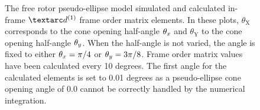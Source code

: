 \begin{figure}
\begin{tabular}{@{}cc@{}}
  \end{tabular}
  \caption[Free rotor pseudo-ellipse simulated and calculated in-frame Daeg$^{(1)}$ elements.]{
    The free rotor pseudo-ellipse model simulated and calculated in-frame $\FOone$ frame order matrix elements.
    In these plots, $\theta_\textrm{X}$ corresponds to the cone opening half-angle $\theta_x$ and $\theta_\textrm{Y}$ to the cone opening half-angle $\theta_y$.
    When the half-angle is not varied, the angle is fixed to either $\theta_x = \pi/4$ or $\theta_y = 3\pi/8$.
    Frame order matrix values have been calculated every 10 degrees.
    The first angle for the calculated elements is set to 0.01 degrees as a pseudo-ellipse cone opening angle of 0.0 cannot be correctly handled by the numerical integration.
  }
  \label{fig: simulated and calculated in-frame 1st degree pseudo-ellipse, free rotor frame order}
\end{figure}

